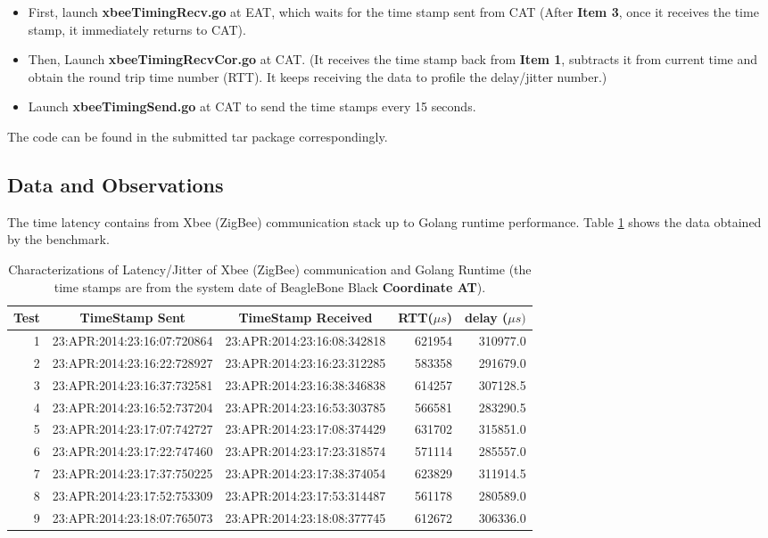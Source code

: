 \documentclass[a4paper,12pt]{article}
\theoremstyle{mytheor}
\begin{document}
\begin{itemize}  
	\label{comm} 
	\item[1.] First, launch  {\bf xbeeTimingRecv.go} at EAT, which waits for the time stamp sent from CAT (After {\bf Item 3}, once it receives the time stamp, it immediately returns to CAT).  
	\item[2.] Then, Launch {\bf xbeeTimingRecvCor.go} at CAT. (It receives the time stamp back from {\bf Item 1}, subtracts it from current time and obtain the round trip time number (RTT). It keeps receiving the data to profile the delay/jitter number.)	 
	\item[3.] Launch {\bf xbeeTimingSend.go} at CAT to send the time stamps  every 15 seconds.  
\end{itemize}
The code can be found in the submitted tar package correspondingly. 

\vspace{0.1in}
 

\subsection{Data and Observations}
 
The time latency contains from Xbee (ZigBee) communication stack up to Golang runtime performance.  Table \ref{tab:rtt} shows the data obtained by the benchmark.

\begin{table}[h]
	\centering
{
	\caption{
		{Characterizations of Latency/Jitter of Xbee (ZigBee) communication and Golang Runtime (the time stamps are from the system date of BeagleBone Black {\bf Coordinate AT}).} 
	}
 		\begin{tabular}{|r|c|c|r||r|}
 				\hline 
 		Test & TimeStamp Sent & TimeStamp Received & RTT($\mu s$) & delay ($\mu s)$ \\ \hline   			\hline 
   	1&	23:APR:2014:23:16:07:720864	& 23:APR:2014:23:16:08:342818 &	621954&	310977.0  \\ \hline 
 	2&	 23:APR:2014:23:16:22:728927&	23:APR:2014:23:16:23:312285	& 583358&	291679.0  \\ \hline 
 	3&	 23:APR:2014:23:16:37:732581&	23:APR:2014:23:16:38:346838	& 614257&	307128.5 \\ \hline 
 	4	& 23:APR:2014:23:16:52:737204&	23:APR:2014:23:16:53:303785 & 566581&	283290.5 \\ \hline 
 	5&	 23:APR:2014:23:17:07:742727&	23:APR:2014:23:17:08:374429 & 631702&	315851.0 \\ \hline 
 	6	& 23:APR:2014:23:17:22:747460&	23:APR:2014:23:17:23:318574 & 571114&	285557.0 \\ \hline 
 	7	& 23:APR:2014:23:17:37:750225&	23:APR:2014:23:17:38:374054	& 623829&	311914.5 \\ \hline 
 	8&	 23:APR:2014:23:17:52:753309&	23:APR:2014:23:17:53:314487 & 561178&	280589.0 \\ \hline 
 	9	& 23:APR:2014:23:18:07:765073&	23:APR:2014:23:18:08:377745	& 612672&	306336.0 \\ \hline 
		\end{tabular} 
	\label{tab:rtt}
}
\end{table}
\end{document}
